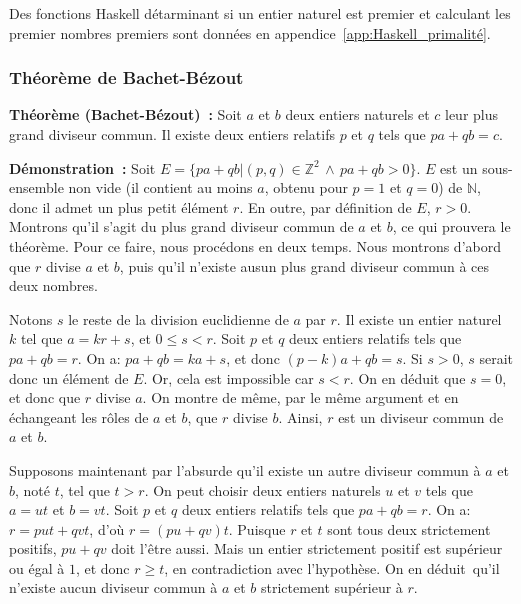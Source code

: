 \done

\bigskip

Des fonctions Haskell détarminant si un entier naturel est premier et calculant les premier nombres premiers sont données en appendice~\ref{app:Haskell_primalité}.

\subsubsection{Théorème de Bachet-Bézout}

\bigskip

\noindent\textbf{Théorème (Bachet-Bézout) :} 
Soit $a$ et $b$ deux entiers naturels et $c$ leur plus grand diviseur commun. 
Il existe deux entiers relatifs $p$ et $q$ tels que $p a + q b = c$. 

\medskip

\noindent\textbf{Démonstration :} 
Soit $E = \lbrace p a + q b \vert (p,q) \in \mathbb{Z}^2 \, \wedge \, p a + q b > 0 \rbrace$. 
$E$ est un sous-ensemble non vide (il contient au moins $a$, obtenu pour $p=1$ et $q=0$) de $\mathbb{N}$, donc il admet un plus petit élément $r$. 
En outre, par définition de $E$, $r > 0$. 
Montrons qu'il s'agit du plus grand diviseur commun de $a$ et $b$, ce qui prouvera le théorème. 
Pour ce faire, nous procédons en deux temps. 
Nous montrons d'abord que $r$ divise $a$ et $b$, puis qu'il n'existe ausun plus grand diviseur commun à ces deux nombres.

Notons $s$ le reste de la division euclidienne de $a$ par $r$. 
Il existe un entier naturel $k$ tel que $a = k r + s$, et $0 \leq s < r$. 
Soit $p$ et $q$ deux entiers relatifs tels que $p a + q b = r$. 
On a: $p a + q b = k a + s$, et donc $(p-k) a + q b = s$. 
Si $s > 0$, $s$ serait donc un élément de $E$. 
Or, cela est impossible car $s < r$. 
On en déduit que $s = 0$, et donc que $r$ divise $a$. 
On montre de même, par le même argument et en échangeant les rôles de $a$ et $b$, que $r$ divise $b$. 
Ainsi, $r$ est un diviseur commun de $a$ et $b$. 

Supposons maintenant par l'absurde qu'il existe un autre diviseur commun à $a$ et $b$, noté $t$, tel que $t > r$. 
On peut choisir deux entiers naturels $u$ et $v$ tels que $a = u t$ et $b = v t$. 
Soit $p$ et $q$ deux entiers relatifs tels que $p a + q b = r$. 
On a: $r = p u t + q v t$, d'où $r = (p u + q v) t$. 
Puisque $r$ et $t$ sont tous deux strictement positifs, $p u + q v$ doit l'être aussi. 
Mais un entier strictement positif est supérieur ou égal à $1$, et donc $r \geq t$, en contradiction avec l'hypothèse. 
On en déduit qu'il n'existe aucun diviseur commun à $a$ et $b$ strictement supérieur à $r$.

